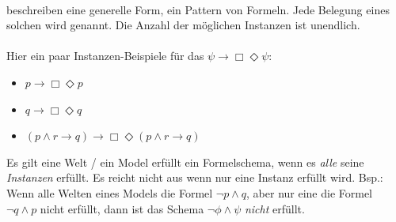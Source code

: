 \paragraph{\formelSchemata} %
\label{par:formel_schemata}
\formelSchemata beschreiben eine generelle Form, ein Pattern von Formeln.
Jede Belegung eines solchen \formelSchematas wird  genannt.
Die Anzahl der möglichen Instanzen ist unendlich.\\
\\
Hier ein paar Instanzen-Beispiele für das \formelSchema $\psi \rightarrow \Box \Diamond \psi$:\\
\begin{itemize}
	\item $p \rightarrow \Box \Diamond p$
	\item $q \rightarrow \Box \Diamond q$
	\item $(p \wedge r \rightarrow q) \rightarrow \Box \Diamond (p \wedge r \rightarrow q)$
\end{itemize}
%
%
Es gilt eine Welt / ein Model erfüllt ein Formelschema, wenn es \emph{alle} seine \emph{Instanzen} erfüllt. 
Es reicht nicht aus wenn nur eine Instanz erfüllt wird. 
Bsp.: Wenn alle Welten eines Models die Formel $\neg p \wedge q$, aber nur eine die Formel $\neg q \wedge p$ nicht erfüllt, dann ist das Schema $\neg \phi \wedge \psi$ \emph{nicht} erfüllt.


